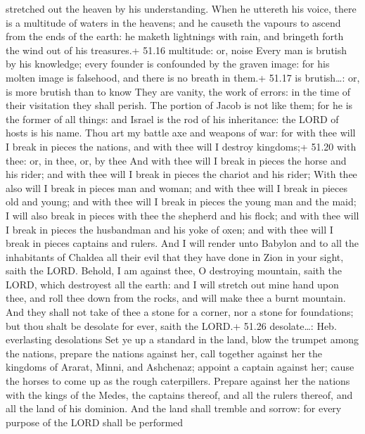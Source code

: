 stretched out the heaven by his understanding.  When he
uttereth his voice, there is a multitude of waters in the heavens; and
he causeth the vapours to ascend from the ends of the earth: he maketh
lightnings with rain, and bringeth forth the wind out of his treasures.+
51.16 multitude: or, noise  Every man is brutish by his
knowledge; every founder is confounded by the graven image: for his
molten image is falsehood, and there is no breath in them.+ 51.17 is
brutish\ldots: or, is more brutish than to know  They are
vanity, the work of errors: in the time of their visitation they shall
perish.  The portion of Jacob is not like them; for he is
the former of all things: and Israel is the rod of his inheritance: the
LORD of hosts is his name.  Thou art my battle axe and
weapons of war: for with thee will I break in pieces the nations, and
with thee will I destroy kingdoms;+ 51.20 with thee: or, in thee, or, by
thee  And with thee will I break in pieces the horse and
his rider; and with thee will I break in pieces the chariot and his
rider;  With thee also will I break in pieces man and
woman; and with thee will I break in pieces old and young; and with thee
will I break in pieces the young man and the maid;  I will
also break in pieces with thee the shepherd and his flock; and with thee
will I break in pieces the husbandman and his yoke of oxen; and with
thee will I break in pieces captains and rulers.  And I
will render unto Babylon and to all the inhabitants of Chaldea all their
evil that they have done in Zion in your sight, saith the LORD.
 Behold, I am against thee, O destroying mountain, saith
the LORD, which destroyest all the earth: and I will stretch out mine
hand upon thee, and roll thee down from the rocks, and will make thee a
burnt mountain.  And they shall not take of thee a stone
for a corner, nor a stone for foundations; but thou shalt be desolate
for ever, saith the LORD.+ 51.26 desolate\ldots: Heb. everlasting
desolations  Set ye up a standard in the land, blow the
trumpet among the nations, prepare the nations against her, call
together against her the kingdoms of Ararat, Minni, and Ashchenaz;
appoint a captain against her; cause the horses to come up as the rough
caterpillers.  Prepare against her the nations with the
kings of the Medes, the captains thereof, and all the rulers thereof,
and all the land of his dominion.  And the land shall
tremble and sorrow: for every purpose of the LORD shall be performed
